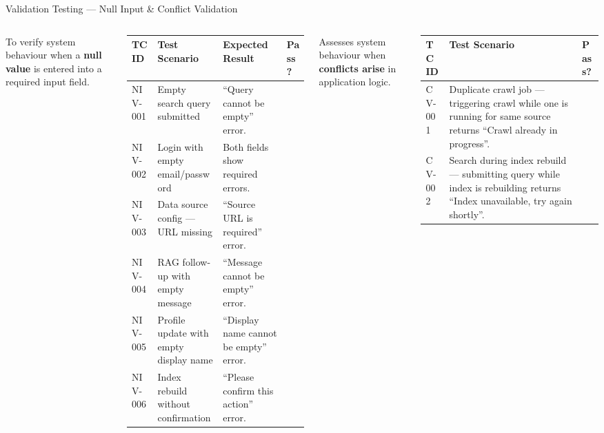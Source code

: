 \documentclass[aspectratio=169,xcolor=dvipsnames]{beamer}
\newcommand{\cmark}{\checkmark}
\newcommand{\tw}{\textwidth}
\begin{document}
\begin{frame}{Validation Testing — Null Input \& Conflict Validation}
  \begin{columns}[t]
    \begin{block}{}
      To verify system behaviour when a \textbf{null value} is entered
      into a required input field.
    \end{block}
    \tiny\renewcommand{\arraystretch}{0.88}
    \begin{table}
      \centering
      \begin{tabular}{p{.10\tw}|p{.38\tw}|p{.28\tw}|p{.14\tw}}
        \toprule
        \textbf{TC ID} & \textbf{Test Scenario} & \textbf{Expected Result} & \textbf{Pass?}\\
        \midrule
        NIV-001 & Empty search query submitted & ``Query cannot be empty'' error. & \textcolor{green!60!black}{\cmark}\\
        NIV-002 & Login with empty email/password & Both fields show required errors. & \textcolor{green!60!black}{\cmark}\\
        NIV-003 & Data source config — URL missing & ``Source URL is required'' error. & \textcolor{green!60!black}{\cmark}\\
        NIV-004 & RAG follow-up with empty message & ``Message cannot be empty'' error. & \textcolor{green!60!black}{\cmark}\\
        NIV-005 & Profile update with empty display name & ``Display name cannot be empty'' error. & \textcolor{green!60!black}{\cmark}\\
        NIV-006 & Index rebuild without confirmation & ``Please confirm this action'' error. & \textcolor{green!60!black}{\cmark}\\
        \bottomrule
      \end{tabular}
    \end{table}
    \begin{block}{}
      Assesses system behaviour when \textbf{conflicts arise} in
      application logic.
    \end{block}
    \tiny\renewcommand{\arraystretch}{0.90}
    \begin{table}
      \centering
      \begin{tabular}{p{.12\tw}|p{.50\tw}|p{.14\tw}}
        \toprule
        \textbf{TC ID} & \textbf{Test Scenario} & \textbf{Pass?}\\
        \midrule
        CV-001 & Duplicate crawl job — triggering crawl while one is running for same source returns ``Crawl already in progress''. & \textcolor{green!60!black}{\cmark}\\
        \midrule
        CV-002 & Search during index rebuild — submitting query while index is rebuilding returns ``Index unavailable, try again shortly''. & \textcolor{green!60!black}{\cmark}\\
        \bottomrule
      \end{tabular}
    \end{table}
  \end{columns}
\end{frame}
\end{document}

